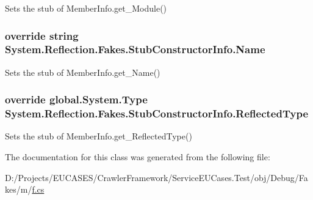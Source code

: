 Sets the stub of Member\-Info.\-get\-\_\-\-Module()

\hypertarget{class_system_1_1_reflection_1_1_fakes_1_1_stub_constructor_info_a3eda4c8e582601826056e3d57d7cb383}{
\subsubsection[{Name}]{\setlength{\rightskip}{0pt plus 5cm}override string System.\-Reflection.\-Fakes.\-Stub\-Constructor\-Info.\-Name\hspace{0.3cm}{\ttfamily [get]}}}\label{class_system_1_1_reflection_1_1_fakes_1_1_stub_constructor_info_a3eda4c8e582601826056e3d57d7cb383}


Sets the stub of Member\-Info.\-get\-\_\-\-Name()

\hypertarget{class_system_1_1_reflection_1_1_fakes_1_1_stub_constructor_info_abab3d3beb949872f2373a710a820203c}{
\subsubsection[{Reflected\-Type}]{\setlength{\rightskip}{0pt plus 5cm}override global.\-System.\-Type System.\-Reflection.\-Fakes.\-Stub\-Constructor\-Info.\-Reflected\-Type\hspace{0.3cm}{\ttfamily [get]}}}\label{class_system_1_1_reflection_1_1_fakes_1_1_stub_constructor_info_abab3d3beb949872f2373a710a820203c}


Sets the stub of Member\-Info.\-get\-\_\-\-Reflected\-Type()



The documentation for this class was generated from the following file\-:\begin{DoxyCompactItemize}
\item 
D\-:/\-Projects/\-E\-U\-C\-A\-S\-E\-S/\-Crawler\-Framework/\-Service\-E\-U\-Cases.\-Test/obj/\-Debug/\-Fakes/m/\hyperlink{m_2f_8cs}{f.\-cs}\end{DoxyCompactItemize}
